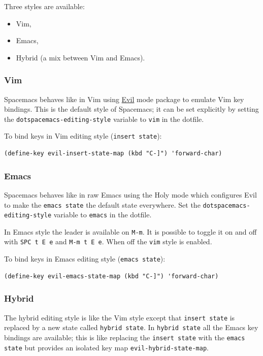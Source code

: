 \documentclass[11pt]{article}
\begin{document}
Three styles are available:
\begin{itemize}
\item Vim,
\item Emacs,
\item Hybrid (a mix between Vim and Emacs).
\end{itemize}

\subsubsection{Vim}
\label{sec:org3a086e8}
Spacemacs behaves like in Vim using \href{https://gitorious.org/evil/pages/Home}{Evil} mode package to emulate Vim key bindings.
This is the default style of Spacemacs; it can be set explicitly by setting
the \texttt{dotspacemacs-editing-style} variable to \texttt{vim} in the dotfile.

To bind keys in Vim editing style (\texttt{insert state}):

\begin{verbatim}
(define-key evil-insert-state-map (kbd "C-]") 'forward-char)
\end{verbatim}

\subsubsection{Emacs}
\label{sec:orgfbe2771}
Spacemacs behaves like in raw Emacs using the Holy mode which configures Evil to
make the \texttt{emacs state} the default state everywhere.
Set the \texttt{dotspacemacs-editing-style} variable to \texttt{emacs} in the dotfile.

In Emacs style the leader is available on \texttt{M-m}. It is possible to toggle it on
and off with \texttt{SPC t E e} and \texttt{M-m t E e}. When off the \texttt{vim} style is enabled.

To bind keys in Emacs editing style (\texttt{emacs state}):

\begin{verbatim}
(define-key evil-emacs-state-map (kbd "C-]") 'forward-char)
\end{verbatim}

\subsubsection{Hybrid}
\label{sec:org3e052cb}
The hybrid editing style is like the Vim style except that \texttt{insert state} is
replaced by a new state called \texttt{hybrid state}. In \texttt{hybrid state} all the Emacs
key bindings are available; this is like replacing the \texttt{insert state} with the
\texttt{emacs state} but provides an isolated key map \texttt{evil-hybrid-state-map}.
\end{document}
